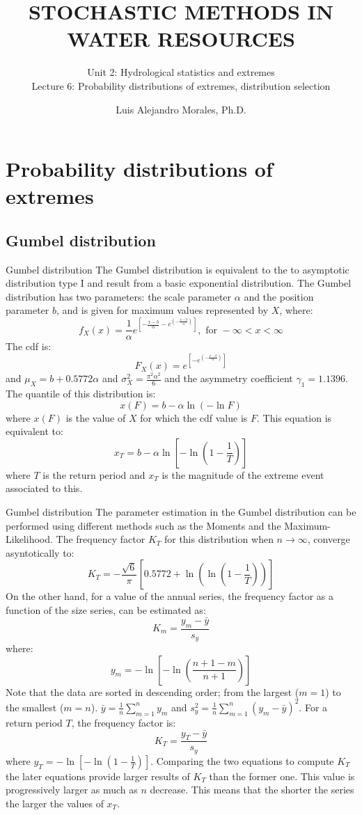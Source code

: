 \documentclass[8pt]{beamer}
\title{STOCHASTIC METHODS IN WATER RESOURCES}
\subtitle{Unit 2: Hydrological statistics and extremes \\ Lecture 6: Probability distributions of extremes, distribution selection}
\author{Luis Alejandro Morales, Ph.D.}
\institute{Universidad Nacional de Colombia \\ Department of Civil and Agriculture Engineering} %
\renewcommand{\emph}[1]{\textcolor{myorange}{#1}}
\begin{document}
\begin{frame}
    \titlepage
\end{frame}

\section{Probability distributions of extremes}
\subsection{Gumbel distribution}
\begin{frame}{Gumbel distribution}
    The \alert{Gumbel distribution} is equivalent to the to asymptotic  distribution type I and result from a basic \emph{exponential distribution}. The \emph{Gumbel distribution} has two parameters: the \emph{scale parameter} $\alpha$ and the \emph{position parameter} $b$, and is given for \emph{maximum values} represented by $X$, where:
    \[
        f_X (x) = \frac{1}{\alpha} e^{\left[ -\frac{x-b}{\alpha} -e^{\left( - \frac{x-b}{\alpha} \right) }\right]}, \text{ for } -\infty < x < \infty
    \]
    The \emph{cdf} is:
\[
    F_X (x) = e^{\left[-e^{\left( -\frac{x-b}{\alpha} \right)} \right]}
\]
and $\mu_X = b + 0.5772 \alpha$ and $\sigma_X^2 = \frac{\pi^2 \alpha^2}{6}$ and the asymmetry coefficient $\gamma_1 = 1.1396$. The \emph{quantile} of this distribution is:
\[
x(F) = b - \alpha \ln(-\ln F)
\]
where $x(F)$ is the value of $X$ for which the \emph{cdf} value is $F$. This equation is equivalent to:
\[
    x_T = b - \alpha \ln \left[ -\ln \left( 1- \frac{1}{T} \right) \right]
\]
where $T$ is the \emph{return period} and $x_T$  is the magnitude of the extreme event associated to this. 
\end{frame}

\begin{frame}{Gumbel distribution}
    The parameter estimation in the \emph{Gumbel distribution} can be performed using different methods such as the Moments and the Maximum-Likelihood. The \emph{frequency factor} $K_T$ for this distribution when $n\rightarrow \infty$, converge asyntotically to:
    \[
        K_T = - \frac{\sqrt{6}}{\pi} \left[ 0.5772 + \ln \left( \ln \left( 1-\frac{1}{T} \right) \right) \right]
    \]
    On the other hand, for a value of the annual series, the \emph{frequency factor} as a function of the size series, can be estimated as:
    \[
        K_m = \frac{y_m - \bar{y}}{s_y}
    \]
    where:
\[
    y_m  = -\ln \left[ -\ln \left( \frac{n+1-m}{n+1} \right) \right]
\]
Note that the data are sorted in descending order; from the largest ($m=1$) to the smallest ($m=n$). $\bar{y} = \frac{1}{n} \sum_{m=1}^n y_m$ and $s_y^2 = \frac{1}{n} \sum_{m=1}^n (y_m - \bar{y})^2$.
For a \emph{return period} $T$, the \emph{frequency factor} is:
\[
    K_T = \frac{y_T - \bar{y}}{s_y}
\]
where $y_T = -\ln \left[ -\ln \left( 1- \frac{1}{T} \right) \right]$. Comparing the two equations to compute $K_T$ the later equations provide larger results of $K_T$ than the former one. This value is progressively larger as much as $n$ decrease. This means that the shorter the series the larger the values of $x_T$. 
\end{frame}
\end{document}

